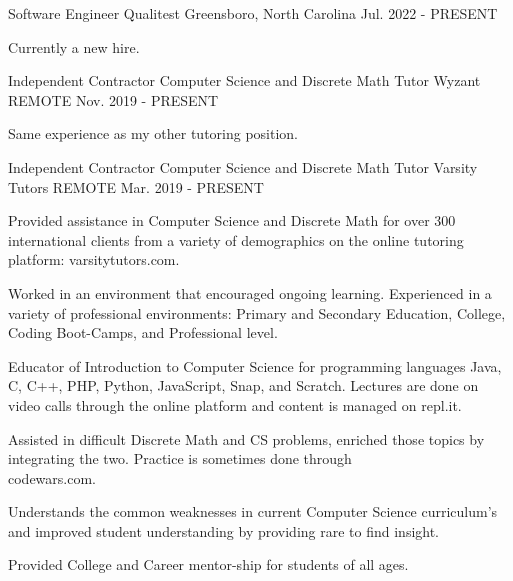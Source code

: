 

\begin{cventries}
  \cventry
    {Software Engineer} %
    {Qualitest} %
    {Greensboro, North Carolina} %
    {Jul. 2022 - PRESENT} %
	{
		\begin{cvitems}
			\item {Currently a new hire.}
		\end{cvitems}
	}

  \cventry
    {Independent Contractor Computer Science and Discrete Math Tutor} %
    {Wyzant} %
    {REMOTE} %
    {Nov. 2019 - PRESENT} %
    {
    	\begin{cvitems}
			\item {Same experience as my other tutoring position.}
		\end{cvitems}
    }
    
  \cventry
    {Independent Contractor Computer Science and Discrete Math Tutor} %
    {Varsity Tutors} %
    {REMOTE} %
    {Mar. 2019 - PRESENT} %
    {
      \begin{cvitems} %
        \item {Provided assistance in Computer Science and Discrete Math for over 300 international clients from a variety of demographics on the online tutoring platform: varsitytutors.com.}
        \item {Worked in an environment that encouraged ongoing learning. Experienced in a variety of professional environments: Primary and Secondary Education, College, Coding Boot-Camps, and Professional level.}
        \item {Educator of Introduction to Computer Science for programming languages Java, C, C++, PHP, Python, JavaScript, Snap, and Scratch. Lectures are done on video calls through the online platform and content is managed on repl.it.}
        \item {Assisted in difficult Discrete Math and CS problems, enriched those topics by integrating the two. Practice is sometimes done through\\codewars.com.}
        \item {Understands the common weaknesses in current Computer Science curriculum's and improved student understanding by providing rare to find insight.}
        \item {Provided College and Career mentor-ship for students of all ages.}
      \end{cvitems}
    }


\end{cventries}
